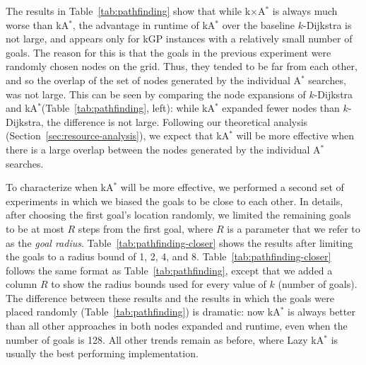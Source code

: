 \documentclass[smallextended]{svjour3}       %
\newcommand{\kD}{$k$-Dijkstra\xspace}
\newcommand{\astar}{A$^*$\xspace}
\newcommand{\kastar}{kA$^*$\xspace}
\newcommand{\kxastar}{k$\times$A$^*$\xspace}
\begin{document}


The results in Table~\ref{tab:pathfinding} show that 
while \kxastar is always much worse than \kastar, the advantage in runtime of \kastar over the baseline \kD is not large, and appears only for \ac{kGP} instances with a relatively small number of goals. 
The reason for this is that the goals in the previous experiment were randomly chosen nodes on the grid. Thus, they tended to be far from each other, and so the overlap of the set of nodes generated by the individual \astar searches, was not large. This can be seen by comparing the node expansions of \kD and \kastar (Table~\ref{tab:pathfinding}, left): while \kastar expanded fewer nodes than \kD, the difference is not large. Following our theoretical analysis (Section~\ref{sec:resource-analysis}), we expect that \kastar will be more effective when there is a large overlap between the nodes generated by the individual \astar searches. 




To characterize when \kastar will be more effective, we performed a second set of experiments in which we biased the goals to be close to each other. In details, after choosing the first goal's location randomly, we limited the remaining goals to be at most $R$ steps from the first goal, where $R$ is a parameter that we refer to as the \emph{goal radius}.  
Table~\ref{tab:pathfinding-closer} shows the results after limiting the goals to a radius bound of 1, 2, 4, and 8. Table~\ref{tab:pathfinding-closer} follows the same format as Table~\ref{tab:pathfinding}, except that we added a column $R$ to show the radius bounds used for every value of $k$ (number of goals). 
The difference between these results and the results in which the goals were placed randomly (Table~\ref{tab:pathfinding}) is dramatic: now \kastar is always better
than all other approaches in both nodes expanded and runtime, even when the number of goals is 128. 
All other trends remain as before, where Lazy \kastar is usually the best performing implementation. 
\end{document}

